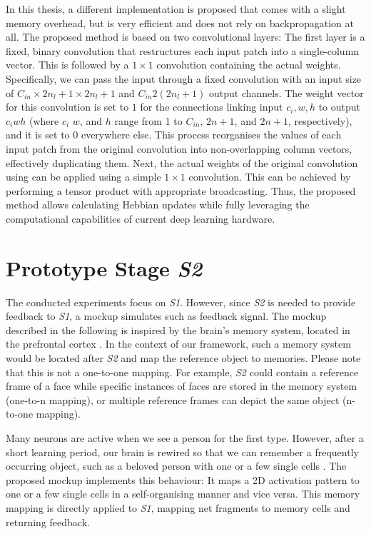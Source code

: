 In this thesis, a different implementation is proposed that comes with a slight memory overhead, but is very efficient and does not rely on backpropagation at all. The proposed method is based on two convolutional layers: The first layer is a fixed, binary convolution that restructures each input patch into a single-column vector. This is followed by a $1\times1$ convolution containing the actual weights. Specifically, we can pass the input through a fixed convolution with an input size of $C_{in} \times 2n_l+1 \times 2n_l+1$ and $C_{in} 2(2n_l+1)$ output channels. The weight vector for this convolution is set to $1$ for the connections linking input $c_i,w,h$ to output $c_iwh$ (where $c_i$ $w$, and $h$ range from 1 to $C_{in}$, $2n+1$, and $2n+1$, respectively), and it is set to 0 everywhere else. This process reorganises the values of each input patch from the original convolution into non-overlapping column vectors, effectively duplicating them. Next, the actual weights of the original convolution using can be applied using a simple $1\times1$ convolution. This can be achieved by performing a tensor product with appropriate broadcasting.
Thus, the proposed method allows calculating Hebbian updates while fully leveraging the computational capabilities of current deep learning hardware.








\section{Prototype Stage \emph{S2}}
The conducted experiments focus on \emph{S1}.
However, since \emph{S2} is needed to provide feedback to \emph{S1}, a mockup simulates such as feedback signal.
The mockup described in the following is inspired by the brain's memory system, located in the prefrontal cortex .
In the context of our framework, such a memory system would be located after \emph{S2} and map the reference object to memories.
Please note that this is not a one-to-one mapping. For example, \emph{S2} could contain a reference frame of a face while specific instances of faces are stored in the memory system (one-to-n mapping), or multiple reference frames can depict the same object (n-to-one mapping).

Many neurons are active when we see a person for the first type.
However, after a short learning period, our brain is rewired so that we can remember a frequently occurring object, such as a beloved person with one or a few single cells .
The proposed mockup implements this behaviour: It maps a 2D activation pattern to one or a few single cells in a self-organising manner and vice versa.
This memory mapping is directly applied to \emph{S1}, mapping net fragments to memory cells and returning feedback.



